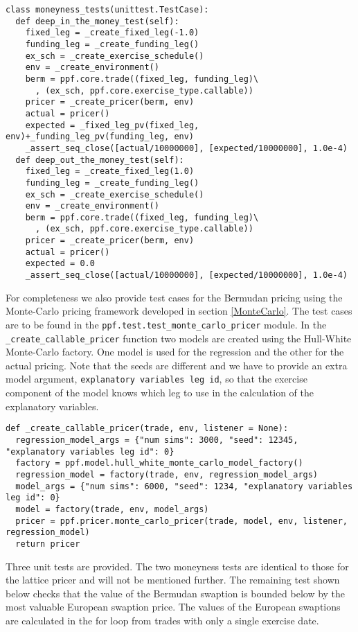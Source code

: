 \begin{verbatim}
class moneyness_tests(unittest.TestCase):
  def deep_in_the_money_test(self):
    fixed_leg = _create_fixed_leg(-1.0)
    funding_leg = _create_funding_leg()
    ex_sch = _create_exercise_schedule()
    env = _create_environment() 
    berm = ppf.core.trade((fixed_leg, funding_leg)\
      , (ex_sch, ppf.core.exercise_type.callable))   
    pricer = _create_pricer(berm, env)
    actual = pricer()
    expected = _fixed_leg_pv(fixed_leg, env)+_funding_leg_pv(funding_leg, env)
    _assert_seq_close([actual/10000000], [expected/10000000], 1.0e-4)
  def deep_out_the_money_test(self):
    fixed_leg = _create_fixed_leg(1.0)
    funding_leg = _create_funding_leg()
    ex_sch = _create_exercise_schedule()
    env = _create_environment() 
    berm = ppf.core.trade((fixed_leg, funding_leg)\
      , (ex_sch, ppf.core.exercise_type.callable))   
    pricer = _create_pricer(berm, env)
    actual = pricer()
    expected = 0.0
    _assert_seq_close([actual/10000000], [expected/10000000], 1.0e-4)
\end{verbatim}

For completeness we also provide test cases for the Bermudan pricing using the Monte-Carlo pricing framework developed in section \ref{MonteCarlo}. The test cases are to be found in the \verb|ppf.test.test_monte_carlo_pricer| module. In the \verb|_create_callable_pricer| function two models are created using the Hull-White Monte-Carlo factory. One model is used for the regression and the other for the actual pricing. Note that the seeds are different and we have to provide an extra model argument, \verb|explanatory variables leg id|, so that the exercise component of the model knows which leg to use in the calculation of the explanatory variables. 

\begin{verbatim}
def _create_callable_pricer(trade, env, listener = None):
  regression_model_args = {"num sims": 3000, "seed": 12345, "explanatory variables leg id": 0} 
  factory = ppf.model.hull_white_monte_carlo_model_factory()
  regression_model = factory(trade, env, regression_model_args)
  model_args = {"num sims": 6000, "seed": 1234, "explanatory variables leg id": 0} 
  model = factory(trade, env, model_args)
  pricer = ppf.pricer.monte_carlo_pricer(trade, model, env, listener, regression_model)
  return pricer
\end{verbatim}

Three unit tests are provided. The two moneyness tests are identical to those for the lattice pricer and will not be mentioned further. The remaining test shown below checks that the value of the Bermudan swaption is bounded below by the most valuable European swaption price. The values of the European swaptions are calculated in the for loop from trades with only a single exercise date.

